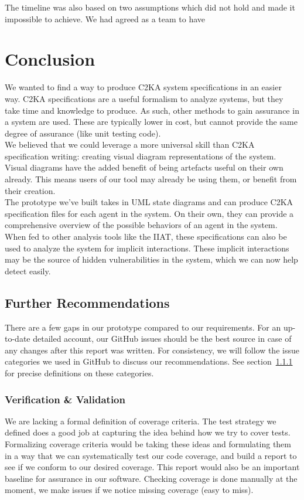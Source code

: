 \documentclass[11pt]{article}
\begin{document}
    The timeline was also based on two assumptions which did not hold and made it impossible to achieve.
    We had agreed as a team to have


    \section{Conclusion}
    We wanted to find a way to produce C2KA system specifications in an easier way.
    C2KA specifications are a useful formalism to analyze systems, but they take time and knowledge to produce.
    As such, other methods to gain assurance in a system are used.
    These are typically lower in cost, but cannot provide the same degree of assurance (like unit testing code).\\

    We believed that we could leverage a more universal skill than C2KA specification writing:
    creating visual diagram representations of the system.
    Visual diagrams have the added benefit of being artefacts useful on their own already.
    This means users of our tool may already be using them, or benefit from their creation.\\

    The prototype we've built takes in UML state diagrams and can produce C2KA specification files for each agent in the system.
    On their own, they can provide a comprehensive overview of the possible behaviors of an agent in the system.
    When fed to other analysis tools like the IIAT,
    these specifications can also be used to analyze the system for implicit interactions.
    These implicit interactions may be the source of hidden vulnerabilities in the system,
    which we can now help detect easily.

    \subsection{Further Recommendations}
    There are a few gaps in our prototype compared to our requirements.
    For an up-to-date detailed account, our GitHub issues should be the best source in case of any changes after this report was written.
    For consistency, we will follow the issue categories we used in GitHub to discuss our recommendations.
    See section~\ref{} for precise definitions on these categories.

    \subsubsection{Verification \& Validation}
    We are lacking a formal definition of coverage criteria.
    The test strategy we defined does a good job at capturing the idea behind how we try to cover tests.
    Formalizing coverage criteria would be taking these ideas and formulating them in a way that we can systematically
    test our code coverage, and build a report to see if we conform to our desired coverage.
    This report would also be an important baseline for assurance in our software.
    Checking coverage is done manually at the moment, we make issues if we notice missing coverage (easy to miss). \\
\end{document}
